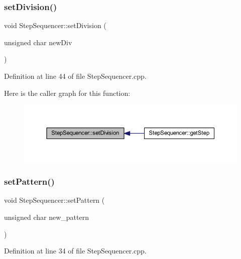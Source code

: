 \subsubsection{\texorpdfstring{set\+Division()}{setDivision()}}
{\footnotesize\ttfamily void Step\+Sequencer\+::set\+Division (\begin{DoxyParamCaption}\item[{unsigned char}]{new\+Div }\end{DoxyParamCaption})}



Definition at line 44 of file Step\+Sequencer.\+cpp.

Here is the caller graph for this function\+:
\nopagebreak
\begin{figure}[H]
\begin{center}
\leavevmode
\includegraphics[width=350pt]{class_step_sequencer_a5d62b641961ca9eaef9273efb9ed38b0_icgraph}
\end{center}
\end{figure}
\mbox{\label{class_step_sequencer_ac611afad54d4336977925b7f3495e8b4}} 
\subsubsection{\texorpdfstring{set\+Pattern()}{setPattern()}}
{\footnotesize\ttfamily void Step\+Sequencer\+::set\+Pattern (\begin{DoxyParamCaption}\item[{unsigned char}]{new\+\_\+pattern }\end{DoxyParamCaption})}



Definition at line 34 of file Step\+Sequencer.\+cpp.

